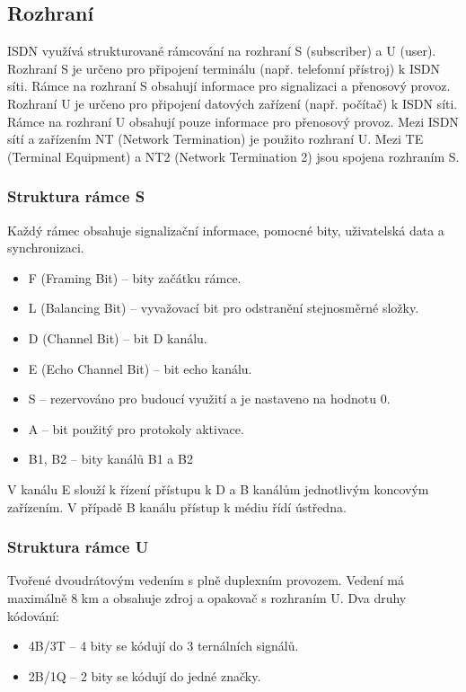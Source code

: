 \subsection{Rozhraní}
ISDN využívá strukturované rámcování na rozhraní S (subscriber) a U (user). Rozhraní S je určeno pro připojení terminálu (např. telefonní přístroj) k ISDN síti. Rámce na rozhraní S obsahují informace pro signalizaci a přenosový provoz. Rozhraní U je určeno pro připojení datových zařízení (např. počítač) k ISDN síti. Rámce na rozhraní U obsahují pouze informace pro přenosový provoz. Mezi ISDN sítí a zařízením NT (Network Termination) je použito rozhraní U. Mezi TE (Terminal Equipment) a NT2 (Network Termination 2) jsou spojena rozhraním S.

\subsubsection{Struktura rámce S}
Každý rámec obsahuje signalizační informace, pomocné bity, uživatelská data a synchronizaci.
\begin{itemize}
    \item F (Framing Bit) -- bity začátku rámce.
    \item L (Balancing Bit) -- vyvažovací bit pro odstranění stejnosměrné složky.
    \item D (Channel Bit) -- bit D kanálu.
    \item E (Echo Channel Bit) -- bit echo kanálu.
    \item S -- rezervováno pro budoucí využití a je nastaveno na hodnotu 0.
    \item A -- bit použitý pro protokoly aktivace.
    \item B1, B2 -- bity kanálů B1 a B2
\end{itemize}
V kanálu E slouží k řízení přístupu k D a B kanálům jednotlivým koncovým zařízením. V případě B kanálu přístup k médiu řídí ústředna.

\subsubsection{Struktura rámce U}
Tvořené dvoudrátovým vedením s plně duplexním provozem. Vedení má maximálně 8 km a obsahuje zdroj a opakovač s rozhraním U. Dva druhy kódování:
\begin{itemize}
    \item 4B/3T -- 4 bity se kódují do 3 ternálních signálů.
    \item 2B/1Q -- 2 bity se kódují do jedné značky.
\end{itemize}

